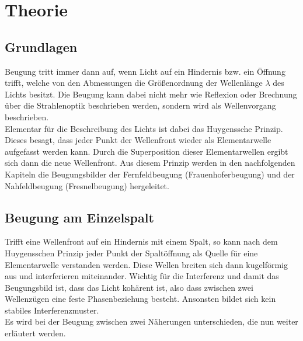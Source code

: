 \section{Theorie}
\label{sec:Theorie}
\subsection{Grundlagen}
\label{sec:grundlagen}
Beugung tritt immer dann auf, wenn Licht auf ein Hindernis bzw. ein Öffnung trifft, welche von den Abmessungen die Größenordnung der Wellenlänge $\lambda$ des Lichts
besitzt. Die Beugung kann dabei nicht mehr wie Reflexion oder Brechnung über die Strahlenoptik beschrieben werden, sondern wird als Wellenvorgang
beschrieben.
\\\noindent
Elementar für die Beschreibung des Lichts ist dabei das Huygenssche Prinzip. Dieses besagt, dass jeder Punkt der Wellenfront wieder als Elementarwelle
aufgefasst werden kann. Durch die Superposition dieser Elementarwellen ergibt sich dann die neue Wellenfront. Aus diesem Prinzip werden in den nachfolgenden
Kapiteln die Beugungsbilder der Fernfeldbeugung (Frauenhoferbeugung) und der Nahfeldbeugung (Fresnelbeugung) hergeleitet.

\subsection{Beugung am Einzelspalt}
\label{sec:einzel}
Trifft eine Wellenfront auf ein Hindernis mit einem Spalt, so kann nach dem Huygensschen Prinzip jeder Punkt der Spaltöffnung als Quelle für eine Elementarwelle
verstanden werden. Diese Wellen breiten sich dann kugelförmig aus und interferieren miteinander. Wichtig für die Interferenz und damit das Beugungsbild ist,
dass das Licht kohärent ist, also dass zwischen zwei Wellenzügen eine feste Phasenbeziehung besteht. Ansonsten bildet sich kein stabiles Interferenzmuster.
\\\noindent
Es wird bei der Beugung zwischen zwei Näherungen unterschieden,
die nun weiter erläutert werden.


